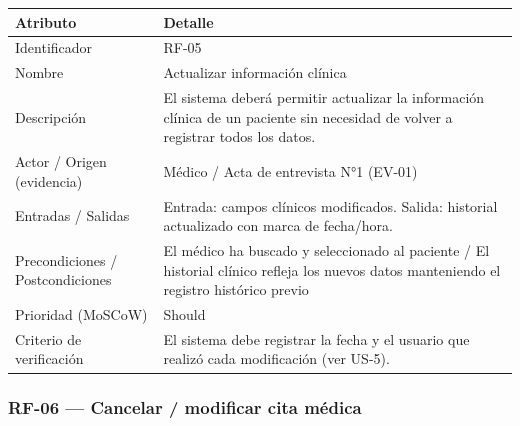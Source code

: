 \documentclass[11pt,a4paper]{article}
\begin{document}
	\begin{longtable}{p{} p{}}
		
		\toprule
		\textbf{Atributo} & \textbf{Detalle} \\
		\midrule
		\endhead
		
		Identificador & RF-05 \\
		Nombre & Actualizar información clínica \\
		Descripción & El sistema deberá permitir actualizar la información clínica de un paciente sin necesidad de volver a registrar todos los datos. \\
		Actor / Origen (evidencia) & Médico / Acta de entrevista N°1 (EV-01) \\
		Entradas / Salidas & Entrada: campos clínicos modificados. Salida: historial actualizado con marca de fecha/hora. \\
		Precondiciones / Postcondiciones & El médico ha buscado y seleccionado al paciente / El historial clínico refleja los nuevos datos manteniendo el registro histórico previo \\
		Prioridad (MoSCoW) & Should \\
		Criterio de verificación & El sistema debe registrar la fecha y el usuario que realizó cada modificación (ver US-5). \\
		
		\bottomrule
		
	\end{longtable}
	
	\subsubsection{RF-06 --- Cancelar / modificar cita médica}
	
\end{document}
